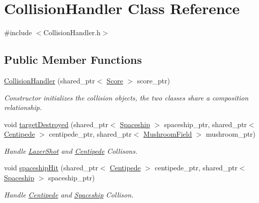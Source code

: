 \hypertarget{class_collision_handler}{}\section{Collision\+Handler Class Reference}
\label{class_collision_handler}


{\ttfamily \#include $<$Collision\+Handler.\+h$>$}

\subsection*{Public Member Functions}
\begin{DoxyCompactItemize}
\item 
\mbox{\hyperlink{class_collision_handler_ad7e987b02f093a6c060b3b9396a323ce}{Collision\+Handler}} (shared\+\_\+ptr$<$ \mbox{\hyperlink{class_score}{Score}} $>$ score\+\_\+ptr)
\begin{DoxyCompactList}\small\item\em Constructor initializes the collision objects, the two classes share a composition relationship. \end{DoxyCompactList}\item 
void \mbox{\hyperlink{class_collision_handler_a38653a91128ac260d2571be8d40c48bf}{target\+Destroyed}} (shared\+\_\+ptr$<$ \mbox{\hyperlink{class_spaceship}{Spaceship}} $>$ spaceship\+\_\+ptr, shared\+\_\+ptr$<$ \mbox{\hyperlink{class_centipede}{Centipede}} $>$ centipede\+\_\+ptr, shared\+\_\+ptr$<$ \mbox{\hyperlink{class_mushroom_field}{Mushroom\+Field}} $>$ mushroom\+\_\+ptr)
\begin{DoxyCompactList}\small\item\em Handle \mbox{\hyperlink{class_lazer_shot}{Lazer\+Shot}} and \mbox{\hyperlink{class_centipede}{Centipede}} Collisons. \end{DoxyCompactList}\item 
void \mbox{\hyperlink{class_collision_handler_a7bdf9fae4c9da0cbb46e43db1326c73a}{spaceship\+Hit}} (shared\+\_\+ptr$<$ \mbox{\hyperlink{class_centipede}{Centipede}} $>$ centipede\+\_\+ptr, shared\+\_\+ptr$<$ \mbox{\hyperlink{class_spaceship}{Spaceship}} $>$ spaceship\+\_\+ptr)
\begin{DoxyCompactList}\small\item\em Handle \mbox{\hyperlink{class_centipede}{Centipede}} and \mbox{\hyperlink{class_spaceship}{Spaceship}} Collison. \end{DoxyCompactList}\item 

\end{DoxyCompactItemize}
